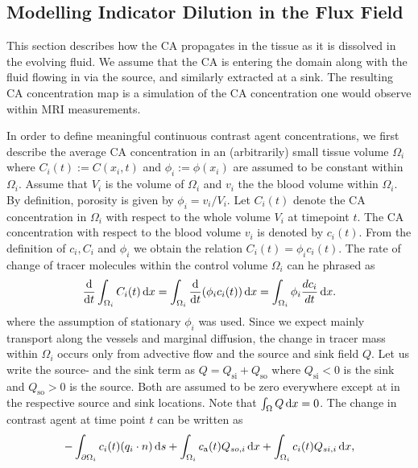 \documentclass[paper=a4, fontsize=11pt,parskip=half,headings=small]{scrartcl}
\newcommand{\Qso}{Q_{\mathrm{so}}}
\newcommand{\Qsi}{Q_{\mathrm{si}}}
\newcommand{\ca}{c_\mathrm{a}}
\newcommand{\sic}{\milli\mol\per\milli\meter\cubed}
\begin{document}
	\subsection{Modelling Indicator Dilution in the Flux Field}\label{sec:transport}
	
	This section describes how the CA propagates in the tissue as it is dissolved in the evolving fluid.
	We assume that the CA is entering the domain along with the fluid flowing in via the source, and similarly extracted at a sink.
	The resulting CA concentration map is a simulation of the CA concentration one would observe within MRI measurements.
	
	In order to define meaningful continuous contrast agent concentrations, we first describe the average CA concentration in an (arbitrarily) small tissue volume $\Omega_i$ where $C_i(t):= C(x_i,t)$ and $\phi_i := \phi(x_i)$ are assumed to be constant within $\Omega_i$.
	Assume that $V_i$ is the volume of $\Omega_i$ and $v_i$ the the blood volume within $\Omega_i$.
	By definition, porosity is given by $\phi_i = v_i/V_i$.
	Let $C_i(t)$ denote the CA concentration in $\Omega_i$ with respect to the whole volume $V_i$ at timepoint $t$.
	The CA concentration with respect to the blood volume $v_i$ is denoted by $c_i(t)$.
	From the definition of $c_i,C_i$ and $\phi_i$ we obtain the relation $C_i(t) = \phi_i  c_i(t)$.
	The rate of change of tracer molecules within the control volume $\Omega_i$ can he phrased as
	\begin{equation}
		\frac{\mathrm{d}}{\mathrm{d} t}\int_{\Omega_i}C_i(t) \,\mathrm{d} x = \int_{\Omega_i}\frac{\mathrm{d}}{\mathrm{d} t}(\phi_i c_i(t)) \,\mathrm{d} x = \int_{\Omega_i} \phi_i \frac{d c_i}{dt}\,\mathrm{d} x.
		\label{eq:dmdt}
	\end{equation}	
	where the assumption of stationary $\phi_i$ was used.
	Since we expect mainly transport along the vessels and marginal diffusion, the change in tracer mass within $\Omega_i$ occurs only from advective flow and the source and sink field $Q$.
	Let us write the source- and the sink term as $Q = \Qsi + \Qso$ where $\Qsi < 0$ is the sink and $\Qso > 0$ is the source. 
	Both are assumed to be zero everywhere except at in the respective source and sink locations.
	Note that $\int_\Omega Q \,\mathrm{d} x = 0$. 
	The change in contrast agent at time point $t$ can be written as
	\begin{equation}
		-\int_{ \partial \Omega_i}c_i(t)(q_i \cdot n)\diffint s + \int_{\Omega_i}\ca(t) Q_{so,i} \diffint x + \int_{\Omega_i}c_i(t)Q_{si,i} \diffint x,
		\label{eq:surfflux}
	\end{equation}
\end{document}
